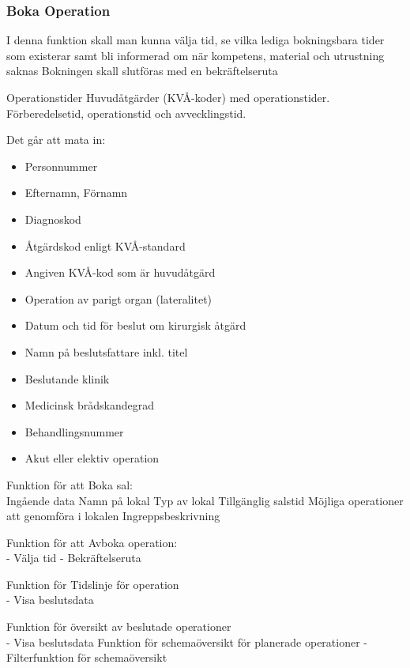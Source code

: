 \documentclass[a4paper,10pt]{article}
\begin{document}
    \subsubsection{Boka Operation}
    
I denna funktion skall man kunna välja tid, se vilka lediga bokningsbara tider som existerar samt bli informerad om när kompetens, material och utrustning saknas
Bokningen skall slutföras med en bekräftelseruta

Operationstider
Huvudåtgärder (KVÅ-koder) med operationstider. Förberedelsetid, operationstid och avvecklingstid. 

Det går att mata in:

\begin{itemize}
	\item Personnummer
	\item Efternamn, Förnamn
	\item Diagnoskod
	\item Åtgärdskod enligt KVÅ-standard
	\item Angiven KVÅ-kod som är huvudåtgärd
	\item Operation av parigt organ (lateralitet)
	\item Datum och tid för beslut om kirurgisk åtgärd
	\item Namn på beslutsfattare inkl. titel
	\item Beslutande klinik
	\item Medicinsk brådskandegrad
	\item Behandlingsnummer
	\item Akut eller elektiv operation	
	
\end{itemize}


Funktion för att Boka sal: \\
Ingående data 
Namn på lokal
Typ av lokal
Tillgänglig salstid
Möjliga operationer att genomföra i lokalen
Ingreppsbeskrivning

Funktion för att Avboka operation: \\
-	Välja tid
-	Bekräftelseruta

Funktion för Tidslinje för operation \\
-	Visa beslutsdata

Funktion för översikt av beslutade operationer \\
-	Visa beslutsdata
Funktion för schemaöversikt för planerade operationer
-	Filterfunktion för schemaöversikt 
\end{document}
